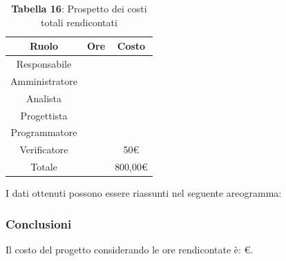 \begin{table}[H]
	\centering
	\renewcommand{\arraystretch}{1.5}
	\begin{tabular}{|c|c|c|}
		\hline
		\rowcolor{lighter-grayer}
		Ruolo & Ore & Costo \\
		\hline
		Responsabile &  &  \\
		\hline
		Amministratore &  &  \\
		\hline
		Analista &  &  \\
		\hline
		Progettista&  &  \\
		\hline
		Programmatore &  &  \\
		\hline
		Verificatore &  & 50\euro \\
		\hline
		Totale &  &  800,00\euro \\
		\hline
	\end{tabular}
	\caption*{\textbf{Tabella 16}: Prospetto dei costi totali rendicontati \\}
\end{table}

I dati ottenuti possono essere riassunti nel seguente areogramma:



\subsubsection{Conclusioni}
Il costo del progetto considerando le ore rendicontate è: \euro.